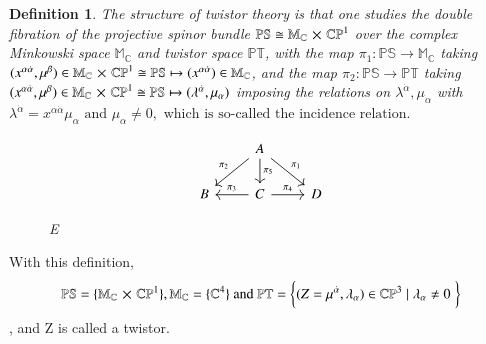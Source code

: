 \documentclass{article}
\newtheorem{definition}{Definition}
\begin{document}
\begin{definition}
The structure of twistor theory is that one studies the double fibration of
  the projective spinor bundle $\mathbb{PS} \cong \mathbb{M_{C}} \cross
  \mathbb{CP}^1$ over the complex Minkowski space 
  $\mathbb{M_{C}}$ and twistor 
  space $\mathbb{PT}$, with the map $\pi_1: \mathbb{PS} \to
  \mathbb{M_{C}}$ taking $(x^{\alpha \dot{\alpha}}, \mu^{\beta})
  \in \mathbb{M_{C}} \cross \mathbb{CP}^1 \cong \mathbb{PS} \mapsto
  (x^{\alpha \dot{\alpha}}) \in \mathbb{M_{C}}$, and the map $\pi_2:
  \mathbb{PS} \to \mathbb{PT}$ taking $(x^{\alpha
  \dot{\alpha}}, \mu^{\beta}) \in \mathbb{M_{C}} \cross \mathbb{CP}^1 \cong
  \mathbb{PS} \mapsto (\lambda^{\dot{\alpha}},
  \mu_{\alpha})$ imposing the relations on
  $\lambda^{\dot{\alpha}}, \mu_{\alpha}$ with $
  \lambda^{\dot{\alpha}} = x^{\alpha \dot{\alpha}} \mu_{\alpha} \text{ and }
  \mu_{\alpha} \neq 0,
  \text{ which is so-called the incidence relation}. $      
 \begin{figure}[h!]
\begin{center}
    \[ \begin{tikzcd}
      & \arrow[swap]{ld}{\pi_2} A \arrow{d}{\pi_5} \arrow{rd}{\pi_1} & \\ 
      B & \arrow[swap]{l}{\pi_3} C \arrow{r}{\pi_4} & D
\end{tikzcd}
\]
\end{center}
   \caption{E}
\label{fig: nig}
\end{figure}

\end{definition}
 
 With this definition,
 \begin{align}
  \label{name}
  \mathbb{PS} = \{\mathbb{M_{C}} \cross
   \mathbb{CP}^{1}\}, \mathbb{M_{C}} = \{\mathbb{C}^4\} \text{ and } \mathbb{PT}
   = \bigg{\{}  ( Z  = \mu^{\dot{\alpha}},
 \lambda_{\alpha} ) \in \mathbb{CP}^{3}
\mid 
 \lambda_{\alpha} \neq 0 \hspace{0.1cm}  \bigg{\}}  
 \end{align}, and Z is called a twistor.
\end{document}
